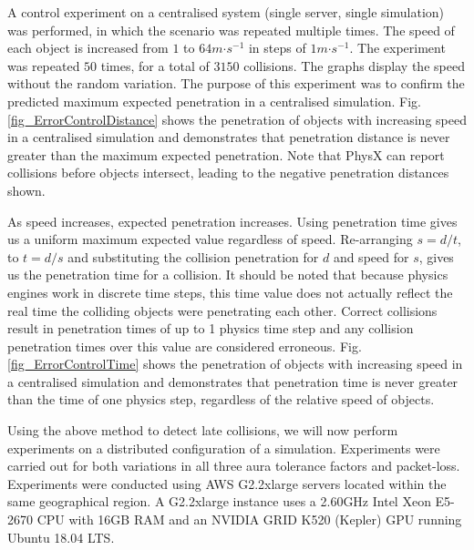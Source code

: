 A control experiment on a centralised system (single server, single simulation) was performed, in which the scenario was repeated multiple times. The speed of each object is increased from $1$ to $64m\mathord{\cdot}s^{-1}$ in steps of $1m\mathord{\cdot}s^{-1}$. The experiment was repeated $50$ times, for a total of $3150$ collisions. The graphs display the speed without the random variation. The purpose of this experiment was to confirm the predicted maximum expected penetration in a centralised simulation. Fig. \ref{fig_ErrorControlDistance} shows the penetration of objects with increasing speed in a centralised simulation and demonstrates that penetration distance is never greater than the maximum expected penetration. Note that PhysX can report collisions before objects intersect, leading to the negative penetration distances shown.

As speed increases, expected penetration increases. Using penetration time gives us a uniform maximum expected value regardless of speed.
Re-arranging $s=d/t$, to $t=d/s$ and substituting the collision penetration for $d$ and speed for $s$, gives us the penetration time for a collision. It should be noted that because physics engines work in discrete time steps, this time value does not actually reflect the real time the colliding objects were penetrating each other. Correct collisions result in penetration times of up to 1 physics time step and any collision penetration times over this value are considered erroneous. Fig. \ref{fig_ErrorControlTime} shows the penetration of objects with increasing speed in a centralised simulation and demonstrates that penetration time is never greater than the time of one physics step, regardless of the relative speed of objects.

Using the above method to detect late collisions, we will now perform experiments on a distributed configuration of a simulation. Experiments were carried out for both variations in all three aura tolerance factors and packet-loss. Experiments were conducted using AWS G2.2xlarge servers located within the same geographical region. A G2.2xlarge instance uses a 2.60GHz Intel Xeon E5-2670 CPU with 16GB RAM and an NVIDIA GRID K520 (Kepler) GPU running Ubuntu 18.04 LTS.

